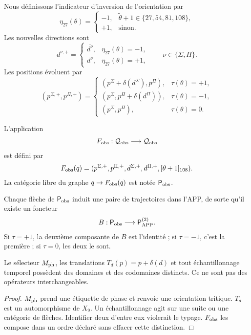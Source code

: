 {Nous définissons l’indicateur d’inversion de l’orientation par
\[
 \eta_{27}(\theta)=
 \begin{cases}
  -1,&\widetilde\theta+1\in\{27,54,81,108\},\\
  +1,&\text{sinon}.
 \end{cases}
\]
Les nouvelles directions sont
\[
 d^{\nu,+}=
 \begin{cases}
  \overline{d^\nu},&\eta_{27}(\theta)=-1,\\
  d^\nu,&\eta_{27}(\theta)=+1,
 \end{cases}
 \qquad \nu\in\{\Sigma,\Pi\}.
\]
Les positions évoluent par
\[
 (p^{\Sigma,+},p^{\Pi,+})=
 \begin{cases}
 (p^\Sigma+\delta(d^\Sigma),p^\Pi),&\tau(\theta)=+1,\\
 (p^\Sigma,p^\Pi+\delta(d^\Pi)),&\tau(\theta)=-1,\\
 (p^\Sigma,p^\Pi),&\tau(\theta)=0.
 \end{cases}
\]

\begin{definition}
\label{p12-83-c1-s3:def:tpk-evolucion-observable}
L'application
\[
 F_{\rm obs}:\mathcal Q_{\rm obs}\longrightarrow\mathcal Q_{\rm obs}
\]
est défini par
\[
 F_{\rm obs}(q)=
 (p^{\Sigma,+},p^{\Pi,+},d^{\Sigma,+},d^{\Pi,+},[\theta+1]_{108}).
\]
La catégorie libre du graphe \(q\to F_{\rm obs}(q)\) est notée
\(\mathsf P_{\rm obs}\).
\end{definition}

Chaque flèche de \(\mathsf P_{\rm obs}\) induit une paire de trajectoires dans
l’APP, de sorte qu’il existe un foncteur
\[
 B:\mathsf P_{\rm obs}\longrightarrow
 \mathsf P_{\rm APP}^{(2)}.
\]
Si \(\tau=+1\), la deuxième composante de \(B\) est l’identité ; si
\(\tau=-1\), c’est la première ; si \(\tau=0\), les deux le sont.

\begin{proposition}
\label{p12-83-c1-s3:prop:tpk-separacion-seleccion-movimiento}
Le sélecteur \(M_{\rm ph}\), les translations
\(T_d(p)=p+\delta(d)\) et tout échantillonnage temporel possèdent des domaines et des
codomaines distincts. Ce ne sont pas des opérateurs interchangeables.
\end{proposition}

\begin{proof}
\(M_{\rm ph}\) prend une étiquette de phase et renvoie une orientation tritique.
\(T_d\) est un automorphisme de \(X_9\). Un échantillonnage agit sur une
suite ou une catégorie de flèches. Identifier deux d’entre eux violerait le
typage. \(F_{\rm obs}\) les compose dans un ordre déclaré sans effacer cette
distinction.
\end{proof}

}
